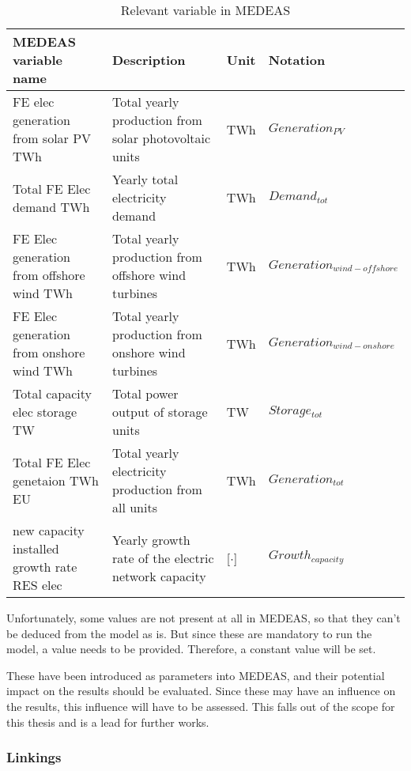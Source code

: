 \begin{table}[h]
    \centering
    \begin{tabular}{|p{5cm}|p{5cm}|p{1cm}|p{4cm}|} \hline 
    MEDEAS variable name &  Description & Unit & Notation \\ \hline
     {\color{red} FE elec generation from solar PV TWh} & Total yearly production from solar photovoltaic units & TWh & {\color{red}$Generation_{PV}$} \\ \hline 
     {\color{red} Total FE Elec demand TWh} & Yearly total electricity demand & TWh & {\color{red}$Demand_{tot}$ } \\ \hline 
     {\color{red} FE Elec generation from offshore wind TWh} & Total yearly production from offshore wind turbines & TWh & {\color{red}$Generation_{wind-offshore}$ } \\ \hline 
     {\color{red} FE Elec generation from onshore wind TWh} & Total yearly production from onshore wind turbines & TWh & {\color{red}$Generation_{wind-onshore}$ } \\ \hline 
     {\color{red} Total capacity elec storage TW} & Total power output of storage units & TW & {\color{red}$Storage_{tot}$ } \\ \hline 
     {\color{red} Total FE Elec genetaion TWh EU} & Total yearly electricity production from all units & TWh & {\color{red}$Generation_{tot}$ } \\ \hline 
     {\color{red} new capacity installed growth rate RES elec} & Yearly growth rate of the electric network capacity & [$\cdot$] & {\color{red}$Growth_{capacity}$ } \\ \hline
    \end{tabular}
    \caption{Relevant variable in MEDEAS}
    \label{tab:medeas-vars}
\end{table}

Unfortunately, some values are not present at all in MEDEAS, so that they can't be deduced from the model as is. But since these are mandatory to run the model, a value needs to be provided. Therefore, a constant value will be set.

These have been introduced as parameters into MEDEAS, and their potential impact on the results should be evaluated. Since these may have an influence on the results, this influence will have to be assessed. This falls out of the scope for this thesis and is a lead for further works.

\subsubsection{Linkings}

